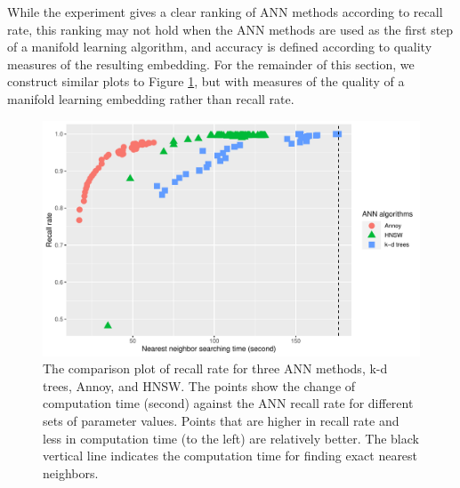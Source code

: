 \documentclass[11pt,a4paper,]{article}
\begin{document}
While the experiment gives a clear ranking of ANN methods according to recall rate, this ranking may not hold when the ANN methods are used as the first step of a manifold learning algorithm, and accuracy is defined according to quality measures of the resulting embedding. For the remainder of this section, we construct similar plots to Figure \ref{fig:recall}, but with measures of the quality of a manifold learning embedding rather than recall rate.

\begin{figure}

{\centering \includegraphics[width=0.8\linewidth]{mlann_ebs_files/figure-latex/recall-1} 

}

\caption{The comparison plot of recall rate for three ANN methods, k-d trees, Annoy, and HNSW. The points show the change of computation time (second) against the ANN recall rate for different sets of parameter values. Points that are higher in recall rate and less in computation time (to the left) are relatively better. The black vertical line indicates the computation time for finding exact nearest neighbors. }\label{fig:recall}
\end{figure}
\end{document}
